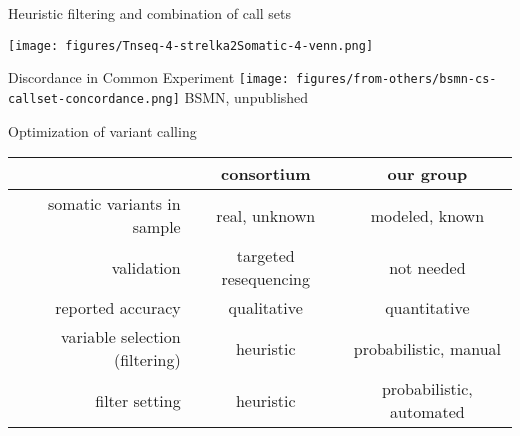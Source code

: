 \documentclass{beamer}
\begin{document}
\begin{frame}{Heuristic filtering and combination of call sets}


\texttt{[image: figures/Tnseq-4-strelka2Somatic-4-venn.png]}
\end{frame}


\begin{frame}{Discordance in Common Experiment}
\texttt{[image: figures/from-others/bsmn-cs-callset-concordance.png]}
\tiny{BSMN, unpublished}
\end{frame}

\begin{frame}{Optimization of variant calling}
\small
\begin{tabular}{r|cc}
& consortium & our group \\
\hline
somatic variants in sample & real, unknown & modeled, known \\
validation & targeted resequencing & not needed \\
reported accuracy & qualitative & quantitative \\
variable selection (filtering) & heuristic & probabilistic, manual \\
filter setting & heuristic & probabilistic, automated \\
\end{tabular}
\end{frame}
\end{document}
